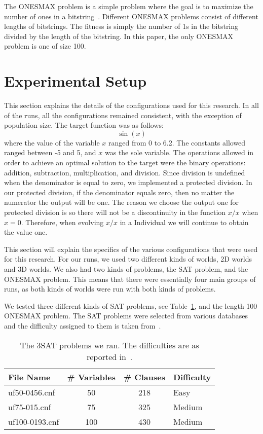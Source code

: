 \documentclass[12pt]{article}
\begin{document}
The ONESMAX problem is a simple problem where the goal is to maximize the number of ones in a bitstring~\cite{Alba:2008}. Different ONESMAX problems consist of different lengths of bitstrings. The fitness is simply the number of 1s in the bitstring divided by the length of the bitstring. In this paper, the only ONESMAX problem is one of size 100.

\section{Experimental Setup} 
\label{sec:experiments}

This section explains the details of the configurations used for this research. In all of the runs, all the configurations remained consistent, with the exception of population size. The target function was as follows:
\[
	\sin(x)
\]
where the value of the variable $x$ ranged from 0 to 6.2. The constants allowed ranged between -5 and 5, and $x$ was the sole variable. The operations allowed in order to achieve an optimal solution to the target were the binary operations: addition, subtraction, multiplication, and division. Since division is undefined when the denominator is equal to zero, we implemented a protected division. In our protected division, if the denominator equals zero, then no matter the numerator the output will be one. The reason we choose the output one for protected division is so there will not  be a discontinuity in the function $x/x$ when $x = 0$. Therefore, when evolving $x/x$ in a Individual we will continue to obtain the value one. 
  


This section will explain the specifics of the various configurations that were used for this research. For our runs, we used two different kinds of worlds, 2D worlds and 3D worlds. We also had two kinds of problems, the SAT problem, and the ONESMAX problem. This means that there were essentially four main groups of runs, as both kinds of worlds were run with both kinds of problems.

We tested three different kinds of SAT problems, see Table~\ref{tab:problemFiles}, and the length 100 ONESMAX problem. The SAT problems were selected from various databases and the difficulty assigned to them is taken from~\cite{ellgren:2011}. 

\begin{table}[tb]
\begin{center}
\begin{tabular}{lccl}
	\textbf{File Name} & \textbf{\# Variables} & \textbf{\# Clauses} & \textbf{Difficulty} \\ \hline
	uf50-0456.cnf & 50 & 218 & Easy \\
	uf75-015.cnf & 75 & 325 & Medium \\
	uf100-0193.cnf & 100 & 430 & Medium \\
\end{tabular}
\caption{The 3SAT problems we ran. The difficulties are as reported in~\cite{ellgren:2011}.}
\label{tab:problemFiles}
\end{center}
\end{table}
\end{document}
